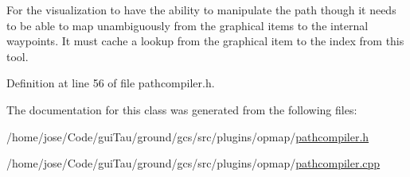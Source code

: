 For the visualization to have the ability to manipulate the path though it needs to be able to map unambiguously from the graphical items to the internal waypoints. It must cache a lookup from the graphical item to the index from this tool. 

Definition at line 56 of file pathcompiler.\-h.



The documentation for this class was generated from the following files\-:\begin{DoxyCompactItemize}
\item 
/home/jose/\-Code/gui\-Tau/ground/gcs/src/plugins/opmap/\hyperlink{pathcompiler_8h}{pathcompiler.\-h}\item 
/home/jose/\-Code/gui\-Tau/ground/gcs/src/plugins/opmap/\hyperlink{pathcompiler_8cpp}{pathcompiler.\-cpp}\end{DoxyCompactItemize}
